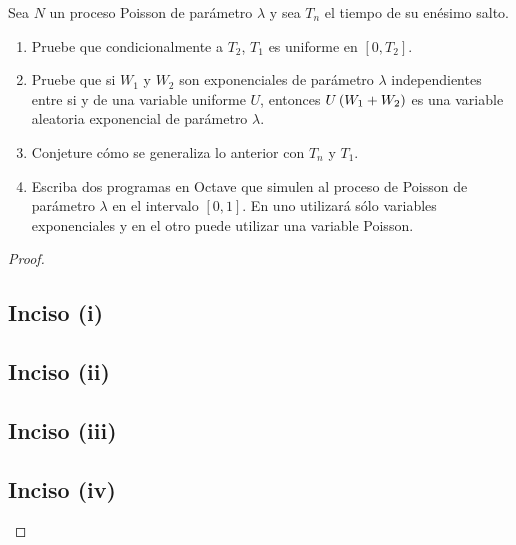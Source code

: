 ﻿\begin{problema}
	Sea $N$ un proceso Poisson de par\'ametro $\lambda$ y sea $T_n$ el tiempo de su en\'esimo salto. 
	
	\begin{enumerate}
		\item[(i)]		[\ref{problema5_1:inciso1}] 
			Pruebe que condicionalmente a $T_2$, $T_1$ es uniforme en $[0,T_2]$.\pn
			
		\item[(ii)]		[\ref{problema5_1:inciso2}] 
			Pruebe que si $W_1$ y $W_2$  son  exponenciales de par\'ametro 
			$\lambda$  independientes entre si y de una variable uniforme $U$, 
			entonces $U\left( W_1+W_2\right) $ es una variable aleatoria exponencial 
			de par\'ametro $\lambda$.\pn

		\item[(iii)]	[\ref{problema5_1:inciso3}] 
			Conjeture c\'omo se  generaliza lo anterior con $T_n$ y $T_1$.\pn

		\item[(iv)]		[\ref{problema5_1:inciso4}] 
			Escriba dos programas en Octave que simulen al proceso de Poisson 
			de par\'ametro $\lambda$ en el intervalo $[0,1]$. En uno utilizar\'a 
			s\'olo variables exponenciales y en el otro puede utilizar una 
			variable Poisson.\pn
	\end{enumerate}
\end{problema}

\begin{proof}
    \subsection{Inciso (i)} \label{problema5_1:inciso1}
    
    \newpage

    \subsection{Inciso (ii)} \label{problema5_1:inciso2}
    
    \newpage

    \subsection{Inciso (iii)} \label{problema5_1:inciso3}
    
	\newpage
	
    \subsection{Inciso (iv)} \label{problema5_1:inciso4}
    
\end{proof}